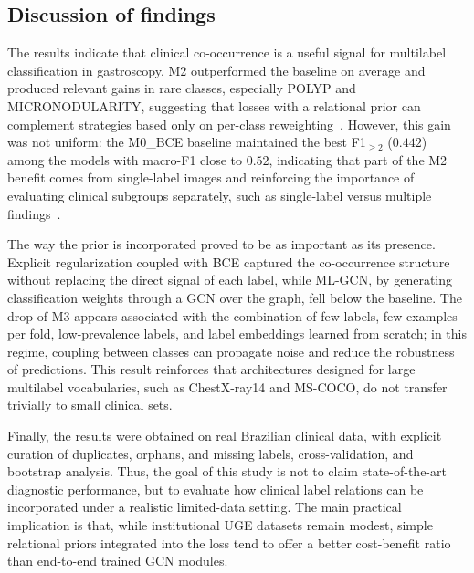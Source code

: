 \documentclass[12pt]{article}
\begin{document}
\subsection{Discussion of findings}

The results indicate that clinical co-occurrence is a useful signal for multilabel classification in gastroscopy. M2 outperformed the baseline on average and produced relevant gains in rare classes, especially POLYP and MICRONODULARITY, suggesting that losses with a relational prior can complement strategies based only on per-class reweighting~\cite{Krenzer2026276}. However, this gain was not uniform: the M0\_BCE baseline maintained the best F1$_{\geq 2}$ ($0.442$) among the models with macro-F1 close to $0.52$, indicating that part of the M2 benefit comes from single-label images and reinforcing the importance of evaluating clinical subgroups separately, such as single-label versus multiple findings~\cite{Liu2024}.

The way the prior is incorporated proved to be as important as its presence. Explicit regularization coupled with BCE captured the co-occurrence structure without replacing the direct signal of each label, while ML-GCN, by generating classification weights through a GCN over the graph, fell below the baseline. The drop of M3 appears associated with the combination of few labels, few examples per fold, low-prevalence labels, and label embeddings learned from scratch; in this regime, coupling between classes can propagate noise and reduce the robustness of predictions. This result reinforces that architectures designed for large multilabel vocabularies, such as ChestX-ray14 and MS-COCO, do not transfer trivially to small clinical sets.

Finally, the results were obtained on real Brazilian clinical data, with explicit curation of duplicates, orphans, and missing labels, cross-validation, and bootstrap analysis. Thus, the goal of this study is not to claim state-of-the-art diagnostic performance, but to evaluate how clinical label relations can be incorporated under a realistic limited-data setting. The main practical implication is that, while institutional UGE datasets remain modest, simple relational priors integrated into the loss tend to offer a better cost-benefit ratio than end-to-end trained GCN modules.

\end{document}
